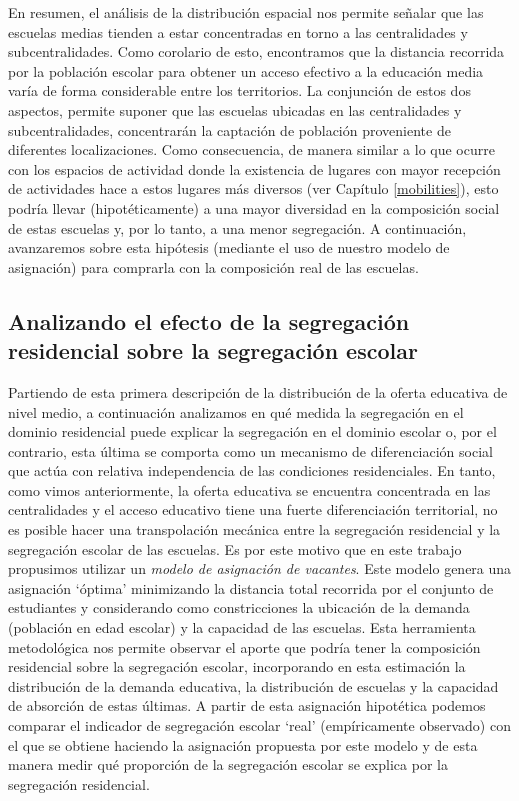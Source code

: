 \documentclass[
  spanish,
  a4paper,%
  chapterprefix=true,%
  DIV=calc,%
  twoside]{scrbook}%
\begin{document}
En resumen, el análisis de la distribución espacial nos permite señalar
que las escuelas medias tienden a estar concentradas en torno a las
centralidades y subcentralidades. Como corolario de esto, encontramos
que la distancia recorrida por la población escolar para obtener un
acceso efectivo a la educación media varía de forma considerable entre
los territorios. La conjunción de estos dos aspectos, permite suponer
que las escuelas ubicadas en las centralidades y subcentralidades,
concentrarán la captación de población proveniente de diferentes
localizaciones. Como consecuencia, de manera similar a lo que ocurre con
los espacios de actividad donde la existencia de lugares con mayor
recepción de actividades hace a estos lugares más diversos (ver Capítulo
\ref{mobilities}), esto podría llevar (hipotéticamente) a una mayor
diversidad en la composición social de estas escuelas y, por lo tanto, a
una menor segregación. A continuación, avanzaremos sobre esta hipótesis
(mediante el uso de nuestro modelo de asignación) para comprarla con la
composición real de las escuelas.

\subsection*{Analizando el efecto de la segregación residencial sobre la segregación escolar}\label{analizando-el-efecto-de-la-segregaciuxf3n-residencial-sobre-la-segregaciuxf3n-escolar}

Partiendo de esta primera descripción de la distribución de la oferta
educativa de nivel medio, a continuación analizamos en qué medida la
segregación en el dominio residencial puede explicar la segregación en
el dominio escolar o, por el contrario, esta última se comporta como un
mecanismo de diferenciación social que actúa con relativa independencia
de las condiciones residenciales. En tanto, como vimos anteriormente, la
oferta educativa se encuentra concentrada en las centralidades y el
acceso educativo tiene una fuerte diferenciación territorial, no es
posible hacer una transpolación mecánica entre la segregación
residencial y la segregación escolar de las escuelas. Es por este motivo
que en este trabajo propusimos utilizar un \emph{modelo de asignación de
vacantes}. Este modelo genera una asignación `óptima' minimizando la
distancia total recorrida por el conjunto de estudiantes y considerando
como constricciones la ubicación de la demanda (población en edad
escolar) y la capacidad de las escuelas. Esta herramienta metodológica
nos permite observar el aporte que podría tener la composición
residencial sobre la segregación escolar, incorporando en esta
estimación la distribución de la demanda educativa, la distribución de
escuelas y la capacidad de absorción de estas últimas. A partir de esta
asignación hipotética podemos comparar el indicador de segregación
escolar `real' (empíricamente observado) con el que se obtiene haciendo
la asignación propuesta por este modelo y de esta manera medir qué
proporción de la segregación escolar se explica por la segregación
residencial.
\end{document}
